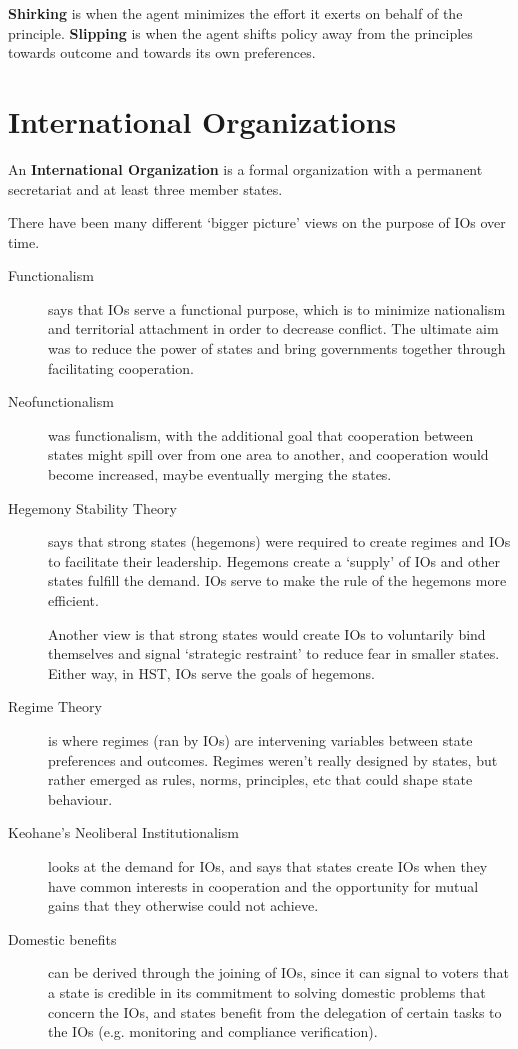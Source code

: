 \textbf{Shirking} is when the agent minimizes the effort it exerts on
behalf of the principle. \textbf{Slipping} is when the agent shifts
policy away from the principles towards outcome and towards its own
preferences.

\section{International Organizations}

An \textbf{International Organization} is a formal organization with a
permanent secretariat and at least three member states.

There have been many different `bigger picture' views on the purpose
of IOs over time.

\begin{description}
  \item[Functionalism] says that IOs serve a functional purpose, which
    is to minimize nationalism and territorial attachment in order to
    decrease conflict. The ultimate aim was to reduce the power of
    states and bring governments together through facilitating
    cooperation.
  \item[Neofunctionalism] was functionalism, with the additional goal
    that cooperation between states might spill over from one area to
    another, and cooperation would become increased, maybe eventually
    merging the states.
  \item[Hegemony Stability Theory] says that strong states (hegemons)
    were required to create regimes and IOs to facilitate their
    leadership. Hegemons create a `supply' of IOs and other states
    fulfill the demand. IOs serve to make the rule of the hegemons more
    efficient.

    Another view is that strong states would create IOs to voluntarily
    bind themselves and signal `strategic restraint' to reduce fear in
    smaller states. Either way, in HST, IOs serve the goals of
    hegemons.
  \item[Regime Theory] is where regimes (ran by IOs) are intervening
    variables between state preferences and outcomes. Regimes weren't
    really designed by states, but rather emerged as rules, norms,
    principles, etc that could shape state behaviour.
  \item[Keohane's Neoliberal Institutionalism] looks at the demand for
    IOs, and says that states create IOs when they have common
    interests in cooperation and the opportunity for mutual gains that
    they otherwise could not achieve.
  \item[Domestic benefits] can be derived through the joining of IOs,
    since it can signal to voters that a state is credible in its
    commitment to solving domestic problems that concern the IOs, and
    states benefit from the delegation of certain tasks to the IOs
    (e.g. monitoring and compliance verification).
\end{description}


